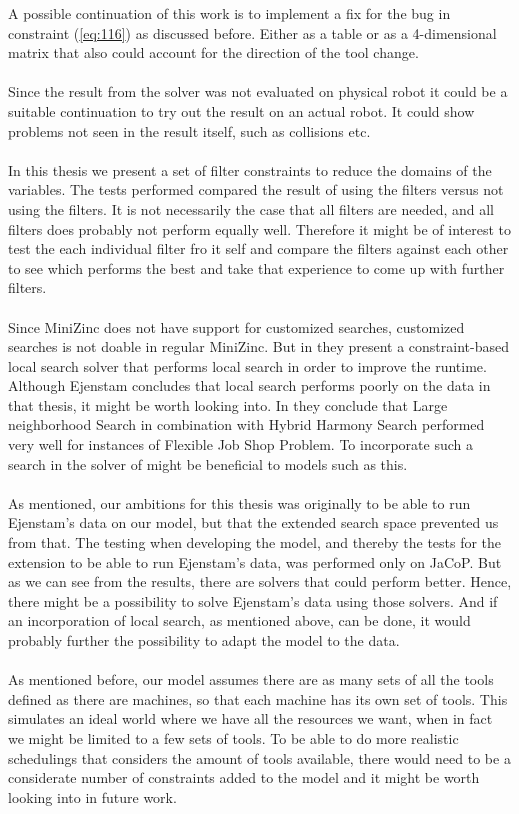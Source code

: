 A possible continuation of this work is to implement a fix for the bug in constraint (\ref{eq:116}) as discussed before. Either as a table or as a 4-dimensional matrix that also could account for the direction of the tool change.
\\\\
Since the result from the solver was not evaluated on physical robot it could be a suitable continuation to try out the result on an actual robot. It could show problems not seen in the result itself, such as collisions etc.
\\\\
In this thesis we present a set of filter constraints to reduce the domains of the variables. The tests performed compared the result of using the filters versus not using the filters. It is not necessarily the case that all filters are needed, and all filters does probably not perform equally well. Therefore it might be of interest to test the each individual filter fro it self and compare the filters against each other to see which performs the best and take that experience to come up with further filters.
\\\\
Since MiniZinc does not have support for customized searches, customized searches is not doable in regular MiniZinc. But in \cite{Bjordal} they present a constraint-based local search solver that performs local search in order to improve the runtime. Although Ejenstam concludes that local search performs poorly on the data in that thesis, it might be worth looking into. In \cite{yuan_2013} they conclude that Large neighborhood Search in combination with Hybrid Harmony Search performed very well for instances of Flexible Job Shop Problem. To incorporate such a search in the solver of \cite{Bjordal} might be beneficial to models such as this.
\\\\
As mentioned, our ambitions for this thesis was originally to be able to run Ejenstam's data on our model, but that the extended search space prevented us from that. The testing when developing the model, and thereby the tests for the extension to be able to run Ejenstam's data, was performed only on JaCoP. But as we can see from the results, there are solvers that could perform better. Hence, there might be a possibility to solve Ejenstam's data using those solvers. And if an incorporation of local search, as mentioned above, can be done, it would probably further the possibility to adapt the model to the data.
\\\\
As mentioned before, our model assumes there are as many sets of all the tools defined as there are machines, so that each machine has its own set of tools. This simulates an ideal world where we have all the resources we want, when in fact we might be limited to a few sets of tools. To be able to do more realistic schedulings that considers the amount of tools available, there would need to be a considerate number of constraints added to the model and it might be worth looking into in future work.